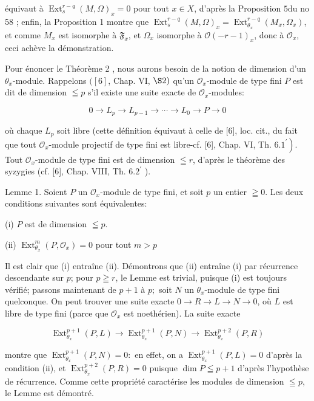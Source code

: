 équivaut à $\operatorname{Ext}_{s}^{r-q}(M, \Omega)_{x}=0$ pour tout $x \in X$, d'après la Proposition $5 \mathrm{du}$ no 58 ; enfin, la Proposition 1 montre que $\operatorname{Ext}_{s}^{r-q}(M, \Omega)_{x}=\operatorname{Ext}_{\theta_{x}}^{r-q}\left(M_{x}, \Omega_{x}\right)$, et comme $M_{x}$ est isomorphe à $\mathfrak{F}_{x}$, et $\Omega_{x}$ isomorphe à $\mathcal{O}(-r-1)_{x}$, donc à $\mathcal{O}_{x}$, ceci achève la démonstration.

Pour énoncer le Théorème 2 , nous aurons besoin de la notion de dimension d'un $\mathcal{\theta}_{x}$-module. Rappelons $([6]$, Chap. VI, $\S 2)$ qu'un $\mathcal{O}_{x}$-module de type fini $P$ est dit de dimension $\leqq p$ s'il existe une suite exacte de $\mathcal{O}_{x}$-modules:

$$
0 \rightarrow L_{p} \rightarrow L_{p-1} \rightarrow \cdots \rightarrow L_{0} \rightarrow P \rightarrow 0
$$

où chaque $L_{p}$ soit libre (cette définition équivaut à celle de [6], loc. cit., du fait que tout $\mathcal{O}_{x}$-module projectif de type fini est libre-cf. [6], Chap. VI\PiI, Th. $\left.6.1^{\prime}\right)$. Tout $\mathcal{O}_{x}$-module de type fini est de dimension $\leqq r$, d'après le théorème des syzygies (cf. [6], Chap. VIII, Th. $6.2^{\prime}$ ).

Lemme 1. Soient $P$ un $\mathcal{O}_{x}$-module de type fini, et soit $p$ un entier $\geqq 0$. Les deux conditions suivantes sont équivalentes:

(i) $P$ est de dimension $\leqq p$.

(ii) $\operatorname{Ext}_{\theta_{x}}^{m}\left(P, \mathcal{O}_{x}\right)=0$ pour tout $m>p$

Il est clair que (i) entraîne (ii). Démontrons que (ii) entraîne (i) par récurrence descendante sur $p$; pour $p \geqq r$, le Lemme est trivial, puisque (i) est toujours vérifié; passons maintenant de $p+1$ à $p ;$ soit $N$ un $\theta_{x}$-module de type fini quelconque. On peut trouver une suite exacte $0 \rightarrow R \rightarrow L \rightarrow N \rightarrow 0$, où $L$ est libre de type fini (parce que $\mathcal{O}_{x}$ est noethérien). La suite exacte

$$
\operatorname{Ext}_{\theta_{x}}^{p+1}(P, L) \rightarrow \operatorname{Ext}_{\theta_{x}}^{p+1}(P, N) \rightarrow \operatorname{Ext}_{\theta_{x}}^{p+2}(P, R)
$$

montre que $\operatorname{Ext}_{\theta_{x}}^{p+1}(P, N)=0:$ en effet, on a $\operatorname{Ext}_{\theta_{x}}^{p+1}(P, L)=0$ d'après la condition (ii), et $\operatorname{Ext}_{\theta_{x}}^{p+2}(P, R)=0$ puisque $\operatorname{dim} P \leqq p+1$ d'après l'hypothèse de récurrence. Comme cette propriété caractérise les modules de dimension $\leqq p$, le Lemme est démontré.

